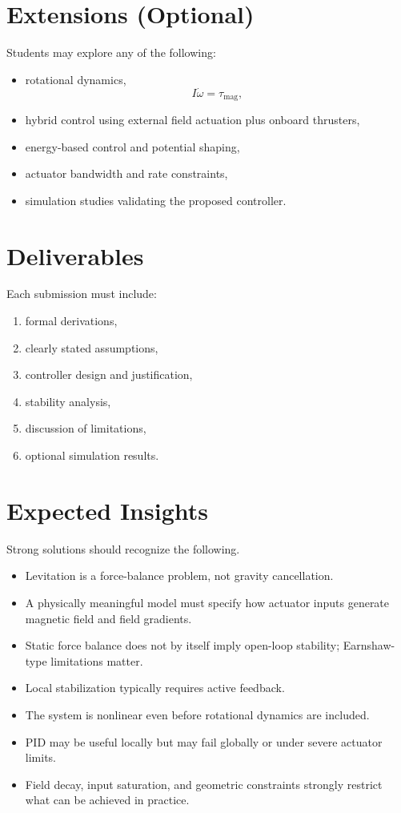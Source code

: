\documentclass[11pt]{article}
\begin{document}
\section{Extensions (Optional)}
Students may explore any of the following:
\begin{itemize}[leftmargin=1.5em]
    \item rotational dynamics,
    \[
    I\dot\omega = \tau_{\mathrm{mag}},
    \]
    \item hybrid control using external field actuation plus onboard thrusters,
    \item energy-based control and potential shaping,
    \item actuator bandwidth and rate constraints,
    \item simulation studies validating the proposed controller.
\end{itemize}

\section{Deliverables}
Each submission must include:
\begin{enumerate}[label=\arabic*.]
    \item formal derivations,
    \item clearly stated assumptions,
    \item controller design and justification,
    \item stability analysis,
    \item discussion of limitations,
    \item optional simulation results.
\end{enumerate}

\section{Expected Insights}
Strong solutions should recognize the following.
\begin{itemize}[leftmargin=1.5em]
    \item Levitation is a force-balance problem, not gravity cancellation.
    \item A physically meaningful model must specify how actuator inputs generate magnetic field and field gradients.
    \item Static force balance does not by itself imply open-loop stability; Earnshaw-type limitations matter.
    \item Local stabilization typically requires active feedback.
    \item The system is nonlinear even before rotational dynamics are included.
    \item PID may be useful locally but may fail globally or under severe actuator limits.
    \item Field decay, input saturation, and geometric constraints strongly restrict what can be achieved in practice.
\end{itemize}
\end{document}
